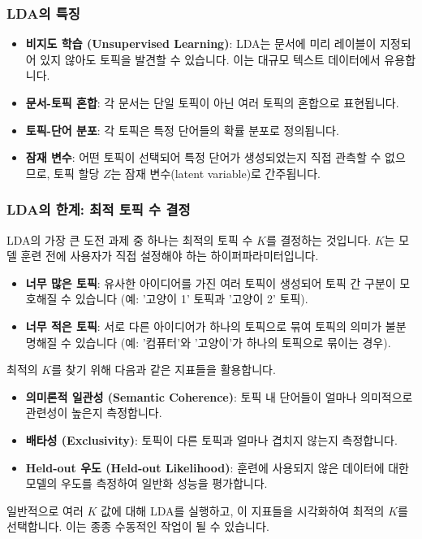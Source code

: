\documentclass[11pt,a4paper]{article}
\theoremstyle{definition}
\begin{document}
\subsubsection{LDA의 특징}
\begin{itemize}
    \item \textbf{비지도 학습 (Unsupervised Learning)}: LDA는 문서에 미리 레이블이 지정되어 있지 않아도 토픽을 발견할 수 있습니다. 이는 대규모 텍스트 데이터에서 유용합니다.
    \item \textbf{문서-토픽 혼합}: 각 문서는 단일 토픽이 아닌 여러 토픽의 혼합으로 표현됩니다.
    \item \textbf{토픽-단어 분포}: 각 토픽은 특정 단어들의 확률 분포로 정의됩니다.
    \item \textbf{잠재 변수}: 어떤 토픽이 선택되어 특정 단어가 생성되었는지 직접 관측할 수 없으므로, 토픽 할당 $Z$는 잠재 변수(latent variable)로 간주됩니다.
\end{itemize}

\subsubsection{LDA의 한계: 최적 토픽 수 결정}
LDA의 가장 큰 도전 과제 중 하나는 최적의 토픽 수 $K$를 결정하는 것입니다. $K$는 모델 훈련 전에 사용자가 직접 설정해야 하는 하이퍼파라미터입니다.

\begin{itemize}
    \item \textbf{너무 많은 토픽}: 유사한 아이디어를 가진 여러 토픽이 생성되어 토픽 간 구분이 모호해질 수 있습니다 (예: '고양이 1' 토픽과 '고양이 2' 토픽).
    \item \textbf{너무 적은 토픽}: 서로 다른 아이디어가 하나의 토픽으로 묶여 토픽의 의미가 불분명해질 수 있습니다 (예: '컴퓨터'와 '고양이'가 하나의 토픽으로 묶이는 경우).
\end{itemize}

최적의 $K$를 찾기 위해 다음과 같은 지표들을 활용합니다.
\begin{itemize}
    \item \textbf{의미론적 일관성 (Semantic Coherence)}: 토픽 내 단어들이 얼마나 의미적으로 관련성이 높은지 측정합니다.
    \item \textbf{배타성 (Exclusivity)}: 토픽이 다른 토픽과 얼마나 겹치지 않는지 측정합니다.
    \item \textbf{Held-out 우도 (Held-out Likelihood)}: 훈련에 사용되지 않은 데이터에 대한 모델의 우도를 측정하여 일반화 성능을 평가합니다.
\end{itemize}
일반적으로 여러 $K$ 값에 대해 LDA를 실행하고, 이 지표들을 시각화하여 최적의 $K$를 선택합니다. 이는 종종 수동적인 작업이 될 수 있습니다.
\end{document}
